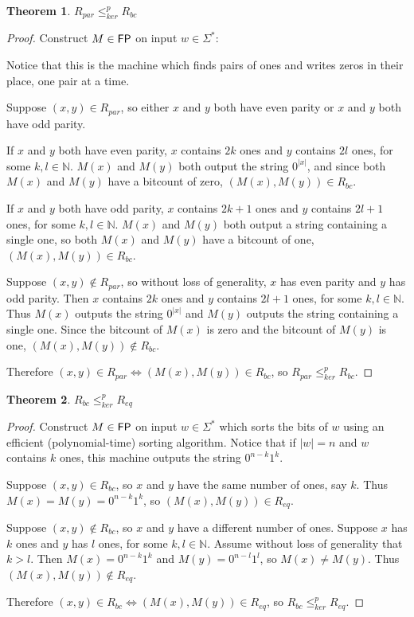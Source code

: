 \documentclass{article}
\newtheorem{theorem}{Theorem}%
\theoremstyle{definition}
\newcommand{\sigmastar}{\Sigma^{*}}
\newcommand{\kr}{\leq^{p}_{ker}} %
\begin{document}
\begin{theorem}$R_{par}\kr R_{bc}$\end{theorem}
\begin{proof}
  Construct $M\in {\ensuremath{\mathsf{FP}}}$ on input $w\in\sigmastar$:\\
  \begin{algorithm}[H]
  \end{algorithm}
  Notice that this is the machine which finds pairs of ones and writes zeros in
  their place, one pair at a time.

  Suppose $(x, y)\in R_{par}$, so either $x$ and $y$ both have even parity or
  $x$ and $y$ both have odd parity.
  
  If $x$ and $y$ both have even parity, $x$ contains $2k$ ones and $y$ contains
  $2l$ ones, for some $k,l\in\mathbb{N}$. $M(x)$ and $M(y)$ both output the
  string $0^{|x|}$, and since both $M(x)$ and $M(y)$ have a bitcount of zero,
  $(M(x), M(y))\in R_{bc}$.

  If $x$ and $y$ both have odd parity, $x$ contains $2k+1$ ones and $y$
  contains $2l+1$ ones, for some $k,l\in\mathbb{N}$. $M(x)$ and $M(y)$ both
  output a string containing a single one, so both $M(x)$ and $M(y)$ have a
  bitcount of one, $(M(x), M(y))\in R_{bc}$.

  Suppose $(x, y)\notin R_{par}$, so without loss of generality, $x$ has even
  parity and $y$ has odd parity. Then $x$ contains $2k$ ones and $y$ contains
  $2l+1$ ones, for some $k,l\in\mathbb{N}$. Thus $M(x)$ outputs the string
  $0^{|x|}$ and $M(y)$ outputs the string containing a single one. Since the
  bitcount of $M(x)$ is zero and the bitcount of $M(y)$ is one,
  $(M(x), M(y))\notin R_{bc}$.

  Therefore $(x, y)\in R_{par} \iff (M(x), M(y))\in R_{bc}$, so
  $R_{par} \kr R_{bc}$.
\end{proof}

\begin{theorem}$R_{bc}\kr R_{eq}$\end{theorem}
\begin{proof}
  Construct $M\in {\ensuremath{\mathsf{FP}}}$ on input $w\in\sigmastar$ which sorts the bits of $w$
  using an efficient (polynomial-time) sorting algorithm. Notice that if
  $|w|=n$ and $w$ contains $k$ ones, this machine outputs the string
  $0^{n-k}1^k$.

  Suppose $(x, y)\in R_{bc}$, so $x$ and $y$ have the same number of ones, say
  $k$. Thus $M(x)=M(y)=0^{n-k}1^k$, so $(M(x), M(y))\in R_{eq}$.
  
  Suppose $(x, y)\notin R_{bc}$, so $x$ and $y$ have a different number of
  ones. Suppose $x$ has $k$ ones and $y$ has $l$ ones, for some
  $k,l\in\mathbb{N}$. Assume without loss of generality that $k>l$. Then
  $M(x)=0^{n-k}1^{k}$ and $M(y)=0^{n-l}1^{l}$, so $M(x)\neq M(y)$. Thus
  $(M(x), M(y))\notin R_{eq}$.

  Therefore $(x, y)\in R_{bc} \iff (M(x), M(y))\in R_{eq}$, so $R_{bc}\kr
  R_{eq}$.
\end{proof}
\end{document}
